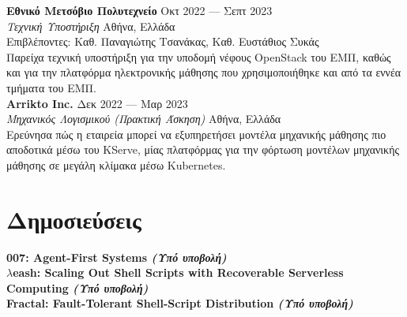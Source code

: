 \documentclass[margin, 10pt]{resume}
\newcommand{\cvName}{Νίκος Παγώνας}
\newcommand{\sectionVSpace}{\vspace{-3.5ex}} %
\newcommand{\authors}[1]{#1\xspace}
\newcommand{\equalContributionNote}{(*ίση συνεισφορά)\xspace}
\newcommand{\fellowship}[1]{\textbf{#1}\xspace}
\newcommand{\institution}[1]{\textbf{#1}\xspace}
\newcommand{\interval}[2]{#1 --- #2\xspace}
\newcommand{\ordinal}[1]{\textsuperscript{#1}\xspace}
\newcommand{\rSection}[1]{\sectionVSpace\section{#1}\xspace}
\newcommand{\paperTitle}[1]{\textbf{#1}\xspace}
\newcommand{\place}[1]{#1\xspace}
\newcommand{\role}[1]{\textit{#1}\xspace}
\newcommand{\stitle}[1]{#1:\xspace}
\newcommand{\underSubmission}{\textit{(Υπό υποβολή)}\xspace}
\newcommand{\venue}[1]{\textit{#1}\xspace}
\begin{document}
\begin{resume}
    \institution{Εθνικό Μετσόβιο Πολυτεχνείο} \hfill \interval{Οκτ 2022}{Σεπτ 2023} \\
    \role{Τεχνική Υποστήριξη} \hfill \place{Αθήνα, Ελλάδα} \\
    \stitle{Επιβλέποντες} Καθ. Παναγιώτης Τσανάκας, Καθ. Ευστάθιος Συκάς \\
    Παρείχα τεχνική υποστήριξη για την υποδομή νέφους OpenStack του ΕΜΠ, καθώς και για την πλατφόρμα ηλεκτρονικής μάθησης που χρησιμοποιήθηκε και από τα εννέα τμήματα του ΕΜΠ. \\

    \institution{Arrikto Inc.} \hfill \interval{Δεκ 2022}{Μαρ 2023} \\
    \role{Μηχανικός Λογισμικού (Πρακτική Άσκηση)} \hfill \place{Αθήνα, Ελλάδα} \\
    Ερεύνησα πώς η εταιρεία μπορεί να εξυπηρετήσει μοντέλα μηχανικής μάθησης πιο αποδοτικά μέσω του KServe, μίας πλατφόρμας για την φόρτωση μοντέλων μηχανικής μάθησης σε μεγάλη κλίμακα μέσω Kubernetes. \\



    \rSection{Δημοσιεύσεις}

    \newcommand{\me}{\textbf{\cvName}\xspace}

    \paperTitle{007: Agent-First Systems \underSubmission} \\

    \paperTitle{\( \lambda \)eash: Scaling Out Shell Scripts with Recoverable Serverless Computing \underSubmission} \\

    \paperTitle{Fractal: Fault-Tolerant Shell-Script Distribution \underSubmission} \\


\end{resume}
\end{document}
